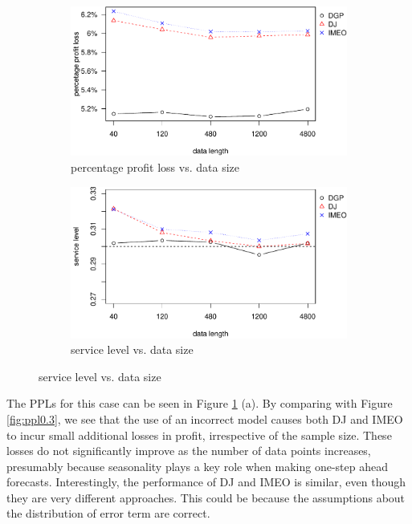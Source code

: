 \documentclass{article}
\begin{document}
\begin{figure}[ht]
\centering
\caption{Performance vs. sample size with under-paramaterised linear model}
\begin{subfigure}[b]{0.48\textwidth}
\centering
\includegraphics[width=\textwidth]{information-plot_files/figure-latex/AR(1)ppl-1.pdf}
\caption{percentage profit loss vs. data size}
\end{subfigure}
\hfill
\begin{subfigure}[b]{0.48\textwidth}
\centering
\includegraphics[width=\textwidth]{information-plot_files/figure-latex/AR(1)sl-1.pdf}
\caption{service level vs. data size}
\end{subfigure}
\label{fig:mis_under}
\end{figure}

The PPLs for this case can be seen in Figure
\ref{fig:mis_under} (a). By comparing with Figure \ref{fig:ppl0.3}, we see that the use of an incorrect model causes both DJ and IMEO to incur small additional losses in profit, irrespective of the sample size. These losses do not significantly improve as the number of data points increases, presumably because seasonality plays a key role when making one-step ahead forecasts. Interestingly, the performance of DJ and IMEO is similar, even though they are very different approaches. This could be because the assumptions about the distribution of error term are correct.
\end{document}
